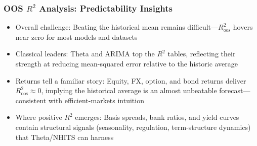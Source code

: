 \documentclass[ignorenonframetext, 9pt]{beamer}
\begin{document}
\begin{frame}
  \frametitle{OOS $R^2$ Analysis: Predictability Insights}
  \begin{itemize}
  \item \alert{Overall challenge:} Beating the historical mean remains difficult—$R^2_{\text{oos}}$ hovers near zero for most models and datasets
  \vspace{0.3cm}
  \item \alert{Classical leaders:} Theta and ARIMA top the $R^2$ tables, reflecting their strength at reducing mean-squared error relative to the historic average
  \vspace{0.3cm}
  \item \alert{Returns tell a familiar story:} Equity, FX, option, and bond returns deliver $R^2_{\text{oos}} \approx 0$, implying the historical average is an almost unbeatable forecast—consistent with efficient-markets intuition
  \vspace{0.3cm}
  \item \alert{Where positive $R^2$ emerges:} Basis spreads, bank ratios, and yield curves contain structural signals (seasonality, regulation, term-structure dynamics) that Theta/NHITS can harness
  \end{itemize}
\end{frame}
\end{document}
